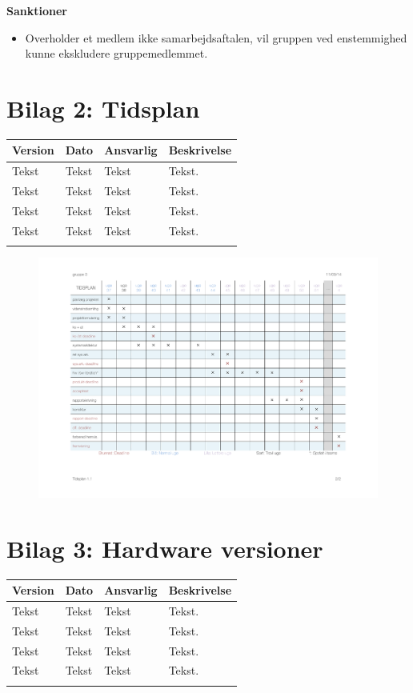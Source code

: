 \textbf{Sanktioner}
\begin{itemize}
    \item Overholder et medlem ikke samarbejdsaftalen, vil gruppen ved enstemmighed kunne ekskludere gruppemedlemmet.
\end{itemize}

\clearpage


\section{Bilag 2: Tidsplan}\label{bilag2}

\begin{longtabu} to 
    Version &    Dato &    Ansvarlig &    Beskrivelse\\[-1ex]
    \midrule
    Tekst &    Tekst &    Tekst &    Tekst.\\
    Tekst &    Tekst &    Tekst &    Tekst.\\
    Tekst &    Tekst &    Tekst &    Tekst.\\
    Tekst &    Tekst &    Tekst &    Tekst.\\
\label{versionTidsplan}
\end{longtabu}

\begin{figure}[H]
    \centering
    \includegraphics[angle=90]{figurer/Tidsplan}
\end{figure}

\clearpage

\section{Bilag 3: Hardware versioner}\label{bilag3}
\begin{longtabu} to 
    Version &    Dato &    Ansvarlig &    Beskrivelse\\[-1ex]
    \midrule
    Tekst &    Tekst &    Tekst &    Tekst.\\
    Tekst &    Tekst &    Tekst &    Tekst.\\
    Tekst &    Tekst &    Tekst &    Tekst.\\
    Tekst &    Tekst &    Tekst &    Tekst.\\
\label{version_HW}
\end{longtabu}

